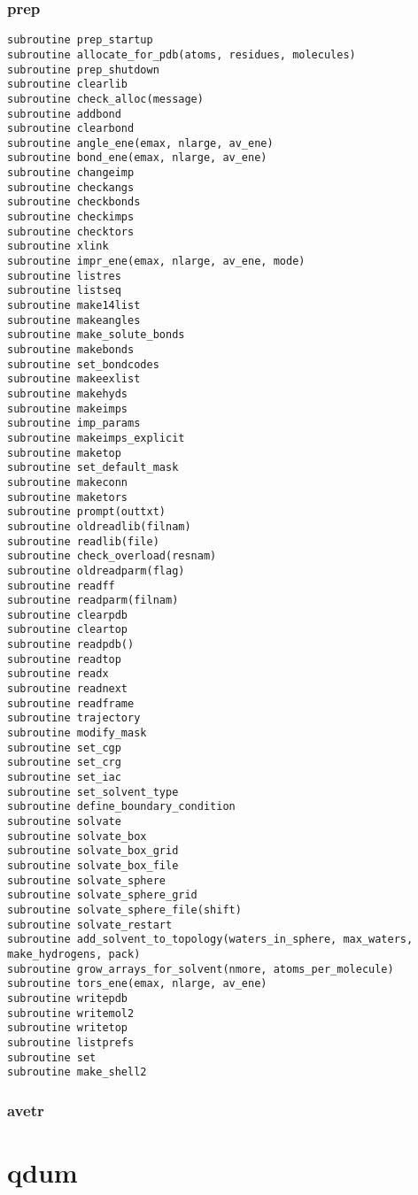 \documentclass[10pt, oneside, pdftex]{article}
\begin{document}
\subsubsection{prep}
\begin{Verbatim}
subroutine prep_startup
subroutine allocate_for_pdb(atoms, residues, molecules)
subroutine prep_shutdown
subroutine clearlib
subroutine check_alloc(message)
subroutine addbond
subroutine clearbond
subroutine angle_ene(emax, nlarge, av_ene)
subroutine bond_ene(emax, nlarge, av_ene)
subroutine changeimp
subroutine checkangs
subroutine checkbonds
subroutine checkimps
subroutine checktors
subroutine xlink
subroutine impr_ene(emax, nlarge, av_ene, mode)
subroutine listres
subroutine listseq
subroutine make14list
subroutine makeangles
subroutine make_solute_bonds
subroutine makebonds
subroutine set_bondcodes
subroutine makeexlist
subroutine makehyds
subroutine makeimps
subroutine imp_params
subroutine makeimps_explicit
subroutine maketop
subroutine set_default_mask
subroutine makeconn
subroutine maketors
subroutine prompt(outtxt)
subroutine oldreadlib(filnam)
subroutine readlib(file)
subroutine check_overload(resnam)
subroutine oldreadparm(flag)
subroutine readff
subroutine readparm(filnam)
subroutine clearpdb
subroutine cleartop
subroutine readpdb()
subroutine readtop
subroutine readx
subroutine readnext
subroutine readframe
subroutine trajectory
subroutine modify_mask
subroutine set_cgp
subroutine set_crg
subroutine set_iac
subroutine set_solvent_type
subroutine define_boundary_condition
subroutine solvate
subroutine solvate_box
subroutine solvate_box_grid
subroutine solvate_box_file
subroutine solvate_sphere
subroutine solvate_sphere_grid
subroutine solvate_sphere_file(shift)
subroutine solvate_restart
subroutine add_solvent_to_topology(waters_in_sphere, max_waters,
make_hydrogens, pack)
subroutine grow_arrays_for_solvent(nmore, atoms_per_molecule)
subroutine tors_ene(emax, nlarge, av_ene)
subroutine writepdb
subroutine writemol2
subroutine writetop
subroutine listprefs
subroutine set
subroutine make_shell2
\end{Verbatim}
 
\subsubsection{avetr} 



\section{qdum}
\label{qdum}
\end{document}
